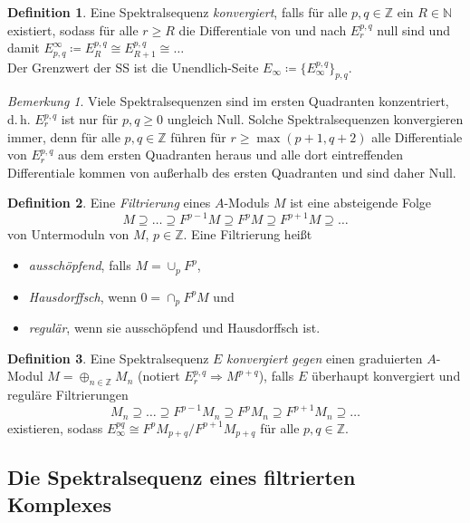 \documentclass[11pt, a4paper, german]{article}
\theoremstyle{definition}
\newtheorem*{defn}{Definition}
\theoremstyle{remark}
\newtheorem*{bem}{Bemerkung}
\newcommand{\N}{\mathbb{N}} %
\newcommand{\Z}{\mathbb{Z}} %
\renewcommand{\dh}{d.\,h.} %
\begin{document}
\begin{defn}
  Eine Spektralsequenz \emph{konvergiert}, falls für alle $p, q \in \Z$ ein $R \in \N$ existiert, sodass für alle $r \geq R$ die Differentiale von und nach $E_r^{p,q}$ null sind und damit $E^\infty_{p,q} \coloneqq E_R^{p,q} \cong E_{R+1}^{p,q} \cong \ldots$ \\[2pt]
  Der Grenzwert der SS ist die Unendlich-Seite $E_\infty \coloneqq \{ E_\infty^{p,q} \}_{p,q}$.
\end{defn}

\begin{bem}
  Viele Spektralsequenzen sind im ersten Quadranten konzentriert, \dh{} $E_r^{p,q}$ ist nur für $p, q \geq 0$ ungleich Null.
  Solche Spektralsequenzen konvergieren immer, denn für alle $p, q \in \Z$ führen für $r \geq \max(p+1, q+2)$ alle Differentiale von $E_r^{p,q}$ aus dem ersten Quadranten heraus und alle dort eintreffenden Differentiale kommen von außerhalb des ersten Quadranten und sind daher Null.
\end{bem}

\begin{defn}
  Eine \emph{Filtrierung} eines $A$-Moduls $M$ ist eine absteigende Folge
  \[ M \supseteq \ldots \supseteq F^{p-1} M \supseteq F^p M \supseteq F^{p+1} M \supseteq \ldots \]
  von Untermoduln von $M$, $p \!\in\! \Z$.
  Eine Filtrierung heißt
  \begin{itemize}
    \item \emph{ausschöpfend}, falls $M = \cup_p F^p$,
    \item \emph{Hausdorffsch}, wenn $0 = \cap_p F^p M$ und
    \item \emph{regulär}, wenn sie ausschöpfend und Hausdorffsch ist.
  \end{itemize}
\end{defn}

\begin{defn}
  Eine Spektralsequenz $E$ \emph{konvergiert gegen} einen graduierten $A$-Modul $M = \oplus_{n \in \Z} M_n$ (notiert $E_r^{p,q} \Rightarrow M^{p+q}$), falls $E$ überhaupt konvergiert und reguläre Filtrierungen
  \[ M_n \supseteq \ldots \supseteq F^{p-1} M_n \supseteq F^p M_n \supseteq F^{p+1} M_n \supseteq \ldots \]
  existieren, sodass $E_\infty^{pq} \cong F^p M_{p+q} / F^{p+1} M_{p+q}$ für alle $p, q \in \Z$.
\end{defn}

\subsection{Die Spektralsequenz eines filtrierten Komplexes}
\end{document}
